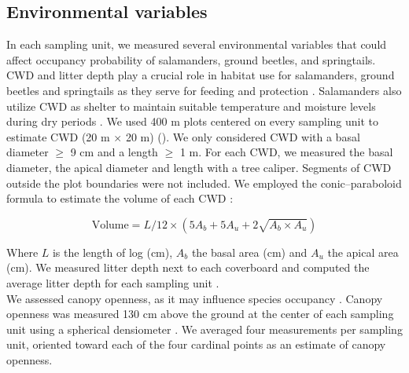 \vspace{0.5cm}


\subsection*{Environmental variables}
\label{subsec:EnvVar}

In each sampling unit, we measured several environmental variables that could affect occupancy probability of salamanders, ground beetles, and springtails.
CWD and litter depth play a crucial role in habitat use for salamanders, ground beetles and springtails as
they serve for feeding and protection  \citep{harmonEcologyCoarseWoody1986,koivula.LeafLitterSmallscale1999,birdChangesSoilLitter2004,mckennyEffectsStructuralComplexity2006}. 
Salamanders also utilize CWD as shelter to maintain suitable temperature and moisture levels during dry periods \citep{Jaeger1980MicrohabitatsTerrestrial,groverInfluenceCoverMoisture1998a,patrickEffectsExperimentalForestry2006a}.
We used 400 m plots centered on every sampling unit to estimate CWD (20 m $\times$  20 m) (\citealp{methotGuideInventaireEchantillonnage2014}). 
We only considered CWD with a basal diameter $\geq$ 9 cm and a length $\geq$ 1 m.
For each CWD, we measured the basal diameter, the apical diameter and length with a tree caliper.
Segments of CWD outside the plot boundaries were not included.
We employed the conic–paraboloid formula to estimate the volume of each CWD \citep{fraverRefiningVolumeEstimates2007} :

\begin{equation}
  \text{Volume} = L/12 \times (5A_b + 5A_u + 2\sqrt{A_b \times A_u})
\end{equation}

\vspace{0.5cm}

Where $L$ is the length of log (cm), $A_b$ the basal area (cm) and $A_u$ the apical area (cm).
We measured litter depth next to each coverboard and computed the average litter depth for each sampling unit \citep{Mazerolle2021Woodlandsalamander}. \\

We assessed canopy openness, as it may influence species occupancy \citep{messereForestFloorDistribution1998,koivulaBorealCarabidbeetleColeoptera2002a,tilghmanMetaanalysisEffectsCanopy2012,henneronForestPlantCommunity2017}.
Canopy openness was measured 130 cm above the ground at the center of each sampling unit using a spherical densiometer \citep{lemmonSphericalDensiometerEstimating1956}. 
We averaged four measurements per sampling unit, oriented toward each of the four cardinal points as an estimate of canopy openness.

